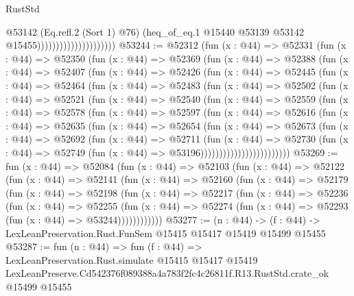 \begin{lexlean}{RustStd}
\begin{coremodule}
                                            @53142
                                            (Eq.refl.{2} (Sort 1) @76)
                                            (heq_of_eq.{1}
                                              @15440
                                              @53139
                                              @53142
                                              @15455)))))))))))))))))))))
@53244 := @52312
    (fun (x : @44) =>
    @52331
      (fun (x : @44) =>
      @52350
        (fun (x : @44) =>
        @52369
          (fun (x : @44) =>
          @52388
            (fun (x : @44) =>
            @52407
              (fun (x : @44) =>
              @52426
                (fun (x : @44) =>
                @52445
                  (fun (x : @44) =>
                  @52464
                    (fun (x : @44) =>
                    @52483
                      (fun (x : @44) =>
                      @52502
                        (fun (x : @44) =>
                        @52521
                          (fun (x : @44) =>
                          @52540
                            (fun (x : @44) =>
                            @52559
                              (fun (x : @44) =>
                              @52578
                                (fun (x : @44) =>
                                @52597
                                  (fun (x : @44) =>
                                  @52616
                                    (fun (x : @44) =>
                                    @52635
                                      (fun (x : @44) =>
                                      @52654
                                        (fun (x : @44) =>
                                        @52673
                                          (fun (x : @44) =>
                                          @52692
                                            (fun (x : @44) =>
                                            @52711
                                              (fun (x : @44) =>
                                              @52730
                                                (fun (x : @44) =>
                                                @52749
                                                  (fun (x : @44) => @53196))))))))))))))))))))))))
@53269 := fun (x : @44) =>
  @52084
    (fun (x : @44) =>
    @52103
      (fun (x : @44) =>
      @52122
        (fun (x : @44) =>
        @52141
          (fun (x : @44) =>
          @52160
            (fun (x : @44) =>
            @52179
              (fun (x : @44) =>
              @52198
                (fun (x : @44) =>
                @52217
                  (fun (x : @44) =>
                  @52236
                    (fun (x : @44) =>
                    @52255
                      (fun (x : @44) =>
                      @52274 (fun (x : @44) => @52293 (fun (x : @44) => @53244))))))))))))
@53277 := (n : @44) ->
  (f : @44) -> LexLeanPreservation.Rust.FunSem @15415 @15417 @15419 @15499 @15455
@53287 := fun (n : @44) =>
  fun (f : @44) =>
  LexLeanPreservation.Rust.simulate
    @15415
    @15417
    @15419
    LexLeanPreserve.Cd542376f089388a4a783f2fc4c26811f.R13.RustStd.crate_ok
    @15499
    @15455
\end{coremodule}
\end{lexlean}
